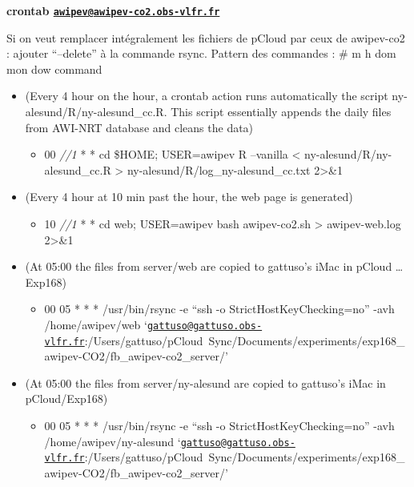 \documentclass[
]{article}
\providecommand{\tightlist}{%
  \setlength{\itemsep}{0pt}\setlength{\parskip}{0pt}}
\begin{document}
\textbf{crontab
\href{mailto:awipev@awipev-co2.obs-vlfr.fr}{\nolinkurl{awipev@awipev-co2.obs-vlfr.fr}}}

Si on veut remplacer intégralement les fichiers de pCloud par ceux de
awipev-co2 : ajouter ``--delete'' à la commande rsync. Pattern des
commandes : \# m h dom mon dow command

\begin{itemize}
\tightlist
\item
  (Every 4 hour on the hour, a crontab action runs automatically the
  script ny-alesund/R/ny-alesund\_cc.R. This script essentially appends
  the daily files from AWI-NRT database and cleans the data)

  \begin{itemize}
  \tightlist
  \item
    00 \emph{//1 } * * cd \$HOME; USER=awipev R --vanilla \textless{}
    ny-alesund/R/ny-alesund\_cc.R \textgreater{}
    ny-alesund/R/log\_ny-alesund\_cc.txt 2\textgreater\&1
  \end{itemize}
\item
  (Every 4 hour at 10 min past the hour, the web page is generated)

  \begin{itemize}
  \tightlist
  \item
    10 \emph{//1 } * * cd web; USER=awipev bash awipev-co2.sh
    \textgreater{} awipev-web.log 2\textgreater\&1
  \end{itemize}
\item
  (At 05:00 the files from server/web are copied to gattuso's iMac in
  pCloud \ldots{} Exp168)

  \begin{itemize}
  \tightlist
  \item
    00 05 * * * /usr/bin/rsync -e ``ssh -o StrictHostKeyChecking=no''
    -avh /home/awipev/web
    `\href{mailto:gattuso@gattuso.obs-vlfr.fr}{\nolinkurl{gattuso@gattuso.obs-vlfr.fr}}:/Users/gattuso/pCloud~Sync/Documents/experiments/exp168\_awipev-CO2/fb\_awipev-co2\_server/'
  \end{itemize}
\item
  (At 05:00 the files from server/ny-alesund are copied to gattuso's
  iMac in pCloud/Exp168)

  \begin{itemize}
  \tightlist
  \item
    00 05 * * * /usr/bin/rsync -e ``ssh -o StrictHostKeyChecking=no''
    -avh /home/awipev/ny-alesund
    `\href{mailto:gattuso@gattuso.obs-vlfr.fr}{\nolinkurl{gattuso@gattuso.obs-vlfr.fr}}:/Users/gattuso/pCloud~Sync/Documents/experiments/exp168\_awipev-CO2/fb\_awipev-co2\_server/'
  \end{itemize}
\end{itemize}
\end{document}
